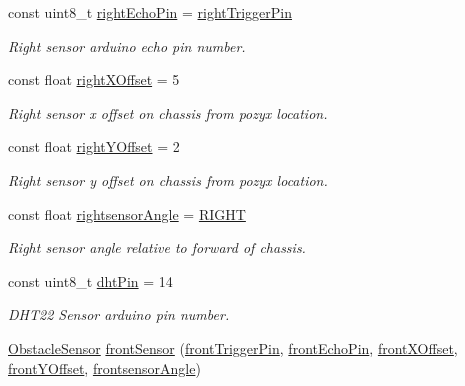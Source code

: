 \begin{DoxyCompactItemize}
const uint8\+\_\+t \mbox{\hyperlink{bot_main_8ino_a513a215c9894c01e37f389b072c5cec4}{right\+Echo\+Pin}} = \mbox{\hyperlink{bot_main_8ino_a906054d9d48970211789ac841d331898}{right\+Trigger\+Pin}}
\begin{DoxyCompactList}\small\item\em Right sensor arduino echo pin number. \end{DoxyCompactList}\item 
const float \mbox{\hyperlink{bot_main_8ino_ac932cddb5bc68094c96d0034c92faef9}{right\+X\+Offset}} = 5
\begin{DoxyCompactList}\small\item\em Right sensor x offset on chassis from pozyx location. \end{DoxyCompactList}\item 
const float \mbox{\hyperlink{bot_main_8ino_a07903b96b48e8e456debd9cc43c7af05}{right\+Y\+Offset}} = 2
\begin{DoxyCompactList}\small\item\em Right sensor y offset on chassis from pozyx location. \end{DoxyCompactList}\item 
const float \mbox{\hyperlink{bot_main_8ino_a83724535498f068d5b44150a2bc4fcf8}{rightsensor\+Angle}} = \mbox{\hyperlink{bot_main_8ino_a80fb826a684cf3f0d306b22aa100ddac}{R\+I\+G\+HT}}
\begin{DoxyCompactList}\small\item\em Right sensor angle relative to forward of chassis. \end{DoxyCompactList}\item 
const uint8\+\_\+t \mbox{\hyperlink{bot_main_8ino_a89e40ffdf0114ea60292ff57879491e2}{dht\+Pin}} = 14
\begin{DoxyCompactList}\small\item\em D\+H\+T22 Sensor arduino pin number. \end{DoxyCompactList}\item 
\mbox{\hyperlink{class_obstacle_sensor}{Obstacle\+Sensor}} \mbox{\hyperlink{bot_main_8ino_a355879266d10af4a6e9126a47bc09113}{front\+Sensor}} (\mbox{\hyperlink{bot_main_8ino_a33df7a8dbfd90327fda79c01f944f56a}{front\+Trigger\+Pin}}, \mbox{\hyperlink{bot_main_8ino_a878ae4b68ec48fc902c4aa953ad565b4}{front\+Echo\+Pin}}, \mbox{\hyperlink{bot_main_8ino_abdd898a2dfa2f64e2821af36c6ed3724}{front\+X\+Offset}}, \mbox{\hyperlink{bot_main_8ino_a4919465d0182f44aa7acaa39ece1e17a}{front\+Y\+Offset}}, \mbox{\hyperlink{bot_main_8ino_ad681cfe410d5d764c513368773b9de93}{frontsensor\+Angle}})

\end{DoxyCompactItemize}
